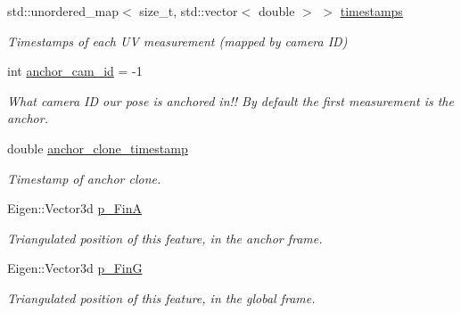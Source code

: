 \begin{DoxyCompactItemize}
std\+::unordered\+\_\+map$<$ size\+\_\+t, std\+::vector$<$ double $>$ $>$ \hyperlink{classov__core_1_1Feature_a16de72ae07065bc81570d63ec694d743}{timestamps}
\begin{DoxyCompactList}\small\item\em Timestamps of each UV measurement (mapped by camera ID) \end{DoxyCompactList}\item 
\mbox{\label{classov__core_1_1Feature_a9d3c50ff0d0e511fc859d6537c90f192}} 
int \hyperlink{classov__core_1_1Feature_a9d3c50ff0d0e511fc859d6537c90f192}{anchor\+\_\+cam\+\_\+id} = -\/1
\begin{DoxyCompactList}\small\item\em What camera ID our pose is anchored in!! By default the first measurement is the anchor. \end{DoxyCompactList}\item 
\mbox{\label{classov__core_1_1Feature_abf559a10ad1ccf1ba44500d2c81fc765}} 
double \hyperlink{classov__core_1_1Feature_abf559a10ad1ccf1ba44500d2c81fc765}{anchor\+\_\+clone\+\_\+timestamp}
\begin{DoxyCompactList}\small\item\em Timestamp of anchor clone. \end{DoxyCompactList}\item 
\mbox{\label{classov__core_1_1Feature_a7c7616f29b0a254a12cdb6244c1f5953}} 
Eigen\+::\+Vector3d \hyperlink{classov__core_1_1Feature_a7c7616f29b0a254a12cdb6244c1f5953}{p\+\_\+\+FinA}
\begin{DoxyCompactList}\small\item\em Triangulated position of this feature, in the anchor frame. \end{DoxyCompactList}\item 
\mbox{\label{classov__core_1_1Feature_a5e9697cf6bd37a344ddaff0631778278}} 
Eigen\+::\+Vector3d \hyperlink{classov__core_1_1Feature_a5e9697cf6bd37a344ddaff0631778278}{p\+\_\+\+FinG}
\begin{DoxyCompactList}\small\item\em Triangulated position of this feature, in the global frame. \end{DoxyCompactList}\end{DoxyCompactItemize}


